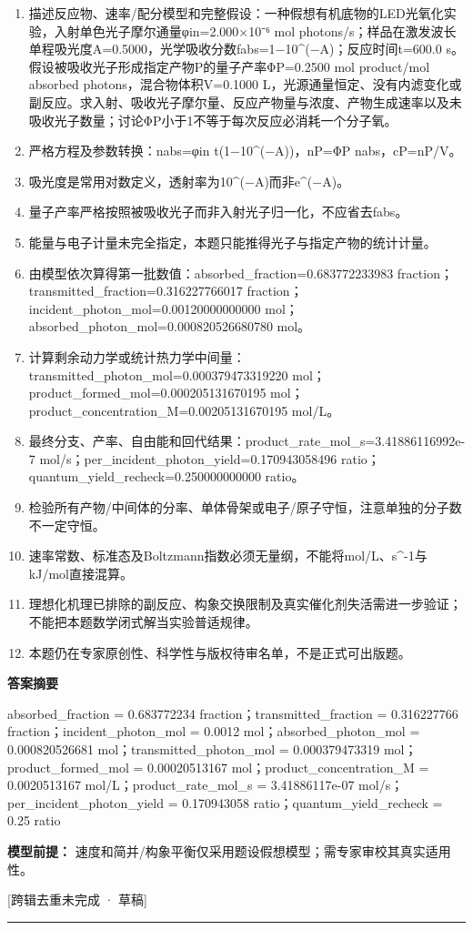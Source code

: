 \documentclass[UTF8,11pt,a4paper]{ctexart}
\begin{document}
\begin{enumerate}
\item 描述反应物、速率/配分模型和完整假设：一种假想有机底物的LED光氧化实验，入射单色光子摩尔通量φin=2.000×10⁻⁶ mol photons/s；样品在激发波长单程吸光度A=0.5000，光学吸收分数fabs=1−10\textasciicircum{}(−A)；反应时间t=600.0 s。假设被吸收光子形成指定产物P的量子产率ΦP=0.2500 mol product/mol absorbed photons，混合物体积V=0.1000 L，光源通量恒定、没有内滤变化或副反应。求入射、吸收光子摩尔量、反应产物量与浓度、产物生成速率以及未吸收光子数量；讨论ΦP小于1不等于每次反应必消耗一个分子氧。
\item 严格方程及参数转换：nabs=φin t(1−10\textasciicircum{}(−A))，nP=ΦP nabs，cP=nP/V。
\item 吸光度是常用对数定义，透射率为10\textasciicircum{}(−A)而非e\textasciicircum{}(−A)。
\item 量子产率严格按照被吸收光子而非入射光子归一化，不应省去fabs。
\item 能量与电子计量未完全指定，本题只能推得光子与指定产物的统计计量。
\item 由模型依次算得第一批数值：absorbed\_fraction=0.683772233983 fraction；transmitted\_fraction=0.316227766017 fraction；incident\_photon\_mol=0.00120000000000 mol；absorbed\_photon\_mol=0.000820526680780 mol。
\item 计算剩余动力学或统计热力学中间量：transmitted\_photon\_mol=0.000379473319220 mol；product\_formed\_mol=0.000205131670195 mol；product\_concentration\_M=0.00205131670195 mol/L。
\item 最终分支、产率、自由能和回代结果：product\_rate\_mol\_s=3.41886116992e-7 mol/s；per\_incident\_photon\_yield=0.170943058496 ratio；quantum\_yield\_recheck=0.250000000000 ratio。
\item 检验所有产物/中间体的分率、单体骨架或电子/原子守恒，注意单独的分子数不一定守恒。
\item 速率常数、标准态及Boltzmann指数必须无量纲，不能将mol/L、s\textasciicircum{}-1与kJ/mol直接混算。
\item 理想化机理已排除的副反应、构象交换限制及真实催化剂失活需进一步验证；不能把本题数学闭式解当实验普适规律。
\item 本题仍在专家原创性、科学性与版权待审名单，不是正式可出版题。
\end{enumerate}
\noindent\textbf{答案摘要}\par
absorbed\_fraction = 0.683772234 fraction；transmitted\_fraction = 0.316227766 fraction；incident\_photon\_mol = 0.0012 mol；absorbed\_photon\_mol = 0.000820526681 mol；transmitted\_photon\_mol = 0.000379473319 mol；product\_formed\_mol = 0.00020513167 mol；product\_concentration\_M = 0.0020513167 mol/L；product\_rate\_mol\_s = 3.41886117e-07 mol/s；per\_incident\_photon\_yield = 0.170943058 ratio；quantum\_yield\_recheck = 0.25 ratio\par
\noindent\textbf{模型前提：}
速度和简并/构象平衡仅采用题设假想模型；需专家审校其真实适用性。\par
\noindent\textcolor{red!65!black}{[跨辑去重未完成 · 草稿]} \par
\medskip\hrule\medskip
{}
\end{document}
